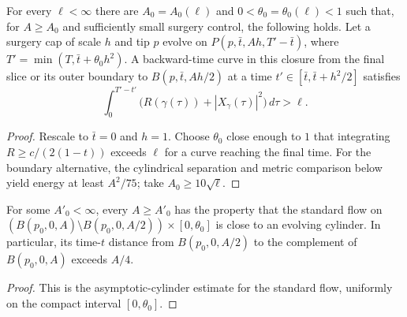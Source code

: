 \begin{proposition}
\label{prop:long-L-length-near-surgery-cap}
\label{bigell}
For every $\ell<\infty$ there are $A_0=A_0(\ell)$ and $0<\theta_0=\theta_0(\ell)<1$ such that, for $A\geq A_0$ and sufficiently small surgery control, the following holds. Let a surgery cap of scale $h$ and tip $p$ evolve on $P(p,\bar t,Ah,T'-\bar t)$, where $T'=\min(T,\bar t+\theta_0h^2)$. A backward-time curve in this closure from the final slice or its outer boundary to $B(p,\bar t,Ah/2)$ at a time $t'\in[\bar t,\bar t+h^2/2]$ satisfies
\[
\int_0^{T'-t'}\bigl(R(\gamma(\tau))+|X_\gamma(\tau)|^2\bigr)\,d\tau>\ell.
\]
\end{proposition}
\label{*}\label{**}
\begin{proof}
\sketch

Rescale to $\bar t=0$ and $h=1$. Choose $\theta_0$ close enough to $1$ that integrating $R\geq c/(2(1-t))$ exceeds $\ell$ for a curve reaching the final time. For the boundary alternative, the cylindrical separation and metric comparison below yield energy at least $A^2/75$; take $A_0\geq10\sqrt\ell$.
\end{proof}

\begin{claim}
\label{claim:standard-solution-neck-at-infinity}
For some $A'_0<\infty$, every $A\geq A'_0$ has the property that the standard flow on $(B(p_0,0,A)\setminus B(p_0,0,A/2))\times[0,\theta_0]$ is close to an evolving cylinder. In particular, its time-$t$ distance from $B(p_0,0,A/2)$ to the complement of $B(p_0,0,A)$ exceeds $A/4$.
\end{claim}
\begin{proof}
\sketch
{}
This is the asymptotic-cylinder estimate for the standard flow, uniformly on the compact interval $[0,\theta_0]$.
\end{proof}

